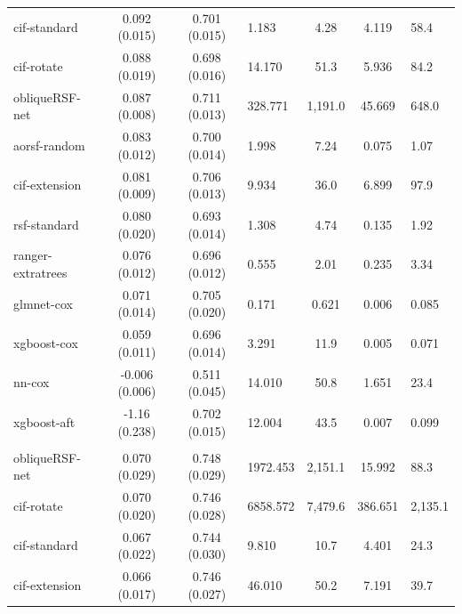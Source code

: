 \documentclass[twoside,11pt]{article}\usepackage[]{graphicx}\usepackage[]{xcolor}
\newenvironment{knitrout}{}{} %
\begin{document}
\begin{knitrout}
\begin{longtable}{lcclccl}
\hspace{1em}cif-standard & 0.092 (0.015) & 0.701 (0.015) & 1.183 & 4.28 & 4.119 & 58.4\\
\hspace{1em}cif-rotate & 0.088 (0.019) & 0.698 (0.016) & 14.170 & 51.3 & 5.936 & 84.2\\
\hspace{1em}obliqueRSF-net & 0.087 (0.008) & 0.711 (0.013) & 328.771 & 1,191.0 & 45.669 & 648.0\\
\hspace{1em}aorsf-random & 0.083 (0.012) & 0.700 (0.014) & 1.998 & 7.24 & 0.075 & 1.07\\
\hspace{1em}cif-extension & 0.081 (0.009) & 0.706 (0.013) & 9.934 & 36.0 & 6.899 & 97.9\\
\hspace{1em}rsf-standard & 0.080 (0.020) & 0.693 (0.014) & 1.308 & 4.74 & 0.135 & 1.92\\
\hspace{1em}ranger-extratrees & 0.076 (0.012) & 0.696 (0.012) & 0.555 & 2.01 & 0.235 & 3.34\\
\hspace{1em}glmnet-cox & 0.071 (0.014) & 0.705 (0.020) & 0.171 & 0.621 & 0.006 & 0.085\\
\hspace{1em}xgboost-cox & 0.059 (0.011) & 0.696 (0.014) & 3.291 & 11.9 & 0.005 & 0.071\\
\hspace{1em}nn-cox & -0.006 (0.006) & 0.511 (0.045) & 14.010 & 50.8 & 1.651 & 23.4\\
\hspace{1em}xgboost-aft & -1.16 (0.238) & 0.702 (0.015) & 12.004 & 43.5 & 0.007 & 0.099\\
\addlinespace[0.3em]
\hline
\multicolumn{7}{l}{\textit{\textbf{Early breast cancer; recurrence or death, n = 614, p = 1692}}}\\
\hline
\hspace{1em}obliqueRSF-net & 0.070 (0.029) & 0.748 (0.029) & 1972.453 & 2,151.1 & 15.992 & 88.3\\
\hspace{1em}cif-rotate & 0.070 (0.020) & 0.746 (0.028) & 6858.572 & 7,479.6 & 386.651 & 2,135.1\\
\hspace{1em}cif-standard & 0.067 (0.022) & 0.744 (0.030) & 9.810 & 10.7 & 4.401 & 24.3\\
\hspace{1em}cif-extension & 0.066 (0.017) & 0.746 (0.027) & 46.010 & 50.2 & 7.191 & 39.7\\

\end{longtable}
\end{knitrout}
\end{document}
